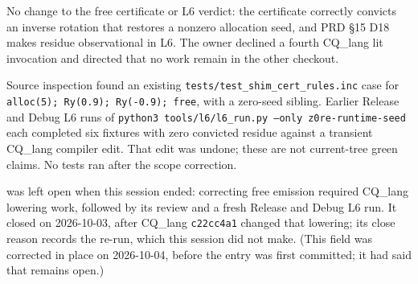 No change to the free certificate or L6 verdict: the certificate correctly
convicts an inverse rotation that restores a nonzero allocation seed, and
PRD \S15 D18 makes residue observational in L6. The owner declined a fourth
CQ\_lang lit invocation and directed that no work remain in the other checkout.

Source inspection found an existing \texttt{tests/test\_shim\_cert\_rules.inc}
case for \texttt{alloc(5); Ry(0.9); Ry(-0.9); free}, with a zero-seed sibling.
Earlier Release and Debug L6 runs of
\texttt{python3 tools/l6/l6\_run.py --only z0re-runtime-seed}
each completed six fixtures with zero convicted residue against a transient
CQ\_lang compiler edit. That edit was undone; these are not current-tree
green claims. No tests ran after the scope correction.

 was left open when this session ended: correcting free emission
required CQ\_lang lowering work, followed by its review and a fresh Release
and Debug L6 run. It closed on 2026-10-03, after CQ\_lang \texttt{c22cc4a1}
changed that lowering; its close reason records the re-run, which this
session did not make. (This field was corrected in place on 2026-10-04,
before the entry was first committed; it had said that 
remains open.)
